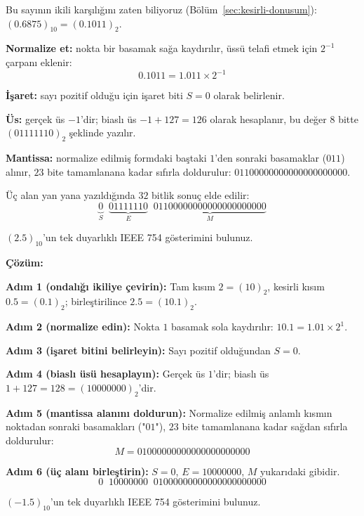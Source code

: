 \begin{ornek}
Bu sayının ikili karşılığını zaten biliyoruz (Bölüm~\ref{sec:kesirli-donusum}):
$(0.6875)_{10}=(0.1011)_2$.

\textbf{Normalize et:} nokta bir basamak sağa kaydırılır, üssü telafi etmek için $2^{-1}$
çarpanı eklenir:
\[
0.1011 = 1.011\times2^{-1}
\]

\textbf{İşaret:} sayı pozitif olduğu için işaret biti $S=0$ olarak belirlenir.

\textbf{Üs:} gerçek üs $-1$'dir; biaslı üs $-1+127=126$ olarak hesaplanır, bu değer $8$
bitte $(01111110)_2$ şeklinde yazılır.

\textbf{Mantissa:} normalize edilmiş formdaki baştaki $1$'den sonraki basamaklar ($011$)
alınır, $23$ bite tamamlanana kadar sıfırla doldurulur: $01100000000000000000000$.

Üç alan yan yana yazıldığında $32$ bitlik sonuç elde edilir:
\[
\underbrace{0}_{S} \;\; \underbrace{01111110}_{E} \;\; \underbrace{01100000000000000000000}_{M}
\]
\end{ornek}

\begin{alistirma}[\orta]
$(2.5)_{10}$'un tek duyarlıklı IEEE 754 gösterimini bulunuz.
\end{alistirma}

\noindent\textbf{Çözüm:}

\noindent\textbf{Adım 1 (ondalığı ikiliye çevirin):} Tam kısım $2=(10)_2$, kesirli kısım
$0.5=(0.1)_2$; birleştirilince $2.5=(10.1)_2$.

\noindent\textbf{Adım 2 (normalize edin):} Nokta $1$ basamak sola kaydırılır:
$10.1=1.01\times2^{1}$.

\noindent\textbf{Adım 3 (işaret bitini belirleyin):} Sayı pozitif olduğundan $S=0$.

\noindent\textbf{Adım 4 (biaslı üsü hesaplayın):} Gerçek üs $1$'dir; biaslı üs
$1+127=128=(10000000)_2$'dir.

\noindent\textbf{Adım 5 (mantissa alanını doldurun):} Normalize edilmiş anlamlı kısmın
noktadan sonraki basamakları ("$01$"), $23$ bite tamamlanana kadar sağdan sıfırla
doldurulur:
\[
M = 01000000000000000000000
\]

\noindent\textbf{Adım 6 (üç alanı birleştirin):} $S=0$, $E=10000000$, $M$ yukarıdaki
gibidir.
\[
0 \;\; 10000000 \;\; 01000000000000000000000
\]

\begin{alistirma}[\zor]
$(-1.5)_{10}$'un tek duyarlıklı IEEE 754 gösterimini bulunuz.
\end{alistirma}

